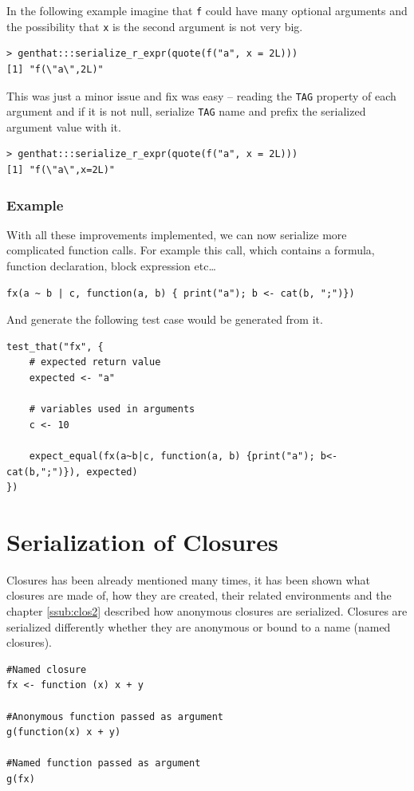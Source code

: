 \documentclass[thesis=B,english]{FITthesis}[2012/10/20]
\begin{document}
In the following example imagine that \verb|f| could have many optional arguments and the possibility that \verb|x| is the second argument is not very big. 


\begin{verbatim}
> genthat:::serialize_r_expr(quote(f("a", x = 2L)))
[1] "f(\"a\",2L)"
\end{verbatim}

This was just a minor issue and fix was easy – reading the \verb|TAG| property of each argument and if it is not null, serialize \verb|TAG| name and prefix the serialized argument value with it.

\begin{verbatim}
> genthat:::serialize_r_expr(quote(f("a", x = 2L)))
[1] "f(\"a\",x=2L)"
\end{verbatim}

\subsection{Example}
With all these improvements implemented, we can now serialize more complicated function calls. For example this call, which contains a formula, function declaration, block expression etc\ldots

\begin{verbatim}
fx(a ~ b | c, function(a, b) { print("a"); b <- cat(b, ";")})
\end{verbatim}

And generate the following test case would be generated from it.
\begin{verbatim}
test_that("fx", {
    # expected return value
    expected <- "a"

    # variables used in arguments
    c <- 10
    
    expect_equal(fx(a~b|c, function(a, b) {print("a"); b<-cat(b,";")}), expected)
})
\end{verbatim}

\chapter{Serialization of Closures} \label{chap:clos}
Closures has been already mentioned many times, it has been shown what closures are made of, how they are created, their related environments and the chapter \ref{ssub:clos2} described how anonymous closures are serialized. Closures are serialized differently whether they are anonymous or bound to a name (named closures). 

\begin{verbatim}
#Named closure
fx <- function (x) x + y

#Anonymous function passed as argument
g(function(x) x + y)

#Named function passed as argument
g(fx)

\end{verbatim}
\end{document}

